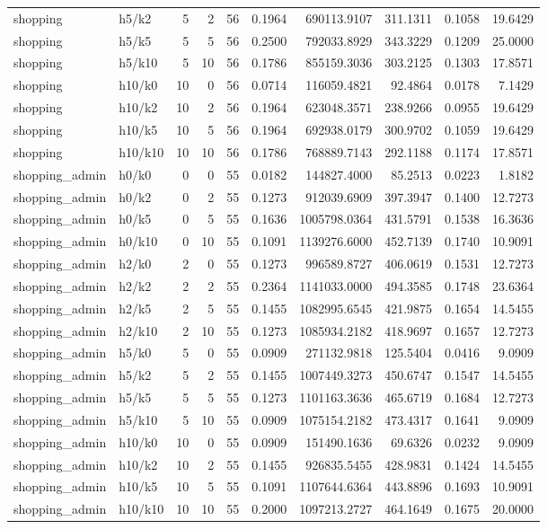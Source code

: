 \begin{tabular}{llrrrrrrrr}
shopping & h5/k2 & 5 & 2 & 56 & 0.1964 & 690113.9107 & 311.1311 & 0.1058 & 19.6429 \\
shopping & h5/k5 & 5 & 5 & 56 & 0.2500 & 792033.8929 & 343.3229 & 0.1209 & 25.0000 \\
shopping & h5/k10 & 5 & 10 & 56 & 0.1786 & 855159.3036 & 303.2125 & 0.1303 & 17.8571 \\
shopping & h10/k0 & 10 & 0 & 56 & 0.0714 & 116059.4821 & 92.4864 & 0.0178 & 7.1429 \\
shopping & h10/k2 & 10 & 2 & 56 & 0.1964 & 623048.3571 & 238.9266 & 0.0955 & 19.6429 \\
shopping & h10/k5 & 10 & 5 & 56 & 0.1964 & 692938.0179 & 300.9702 & 0.1059 & 19.6429 \\
shopping & h10/k10 & 10 & 10 & 56 & 0.1786 & 768889.7143 & 292.1188 & 0.1174 & 17.8571 \\
shopping_admin & h0/k0 & 0 & 0 & 55 & 0.0182 & 144827.4000 & 85.2513 & 0.0223 & 1.8182 \\
shopping_admin & h0/k2 & 0 & 2 & 55 & 0.1273 & 912039.6909 & 397.3947 & 0.1400 & 12.7273 \\
shopping_admin & h0/k5 & 0 & 5 & 55 & 0.1636 & 1005798.0364 & 431.5791 & 0.1538 & 16.3636 \\
shopping_admin & h0/k10 & 0 & 10 & 55 & 0.1091 & 1139276.6000 & 452.7139 & 0.1740 & 10.9091 \\
shopping_admin & h2/k0 & 2 & 0 & 55 & 0.1273 & 996589.8727 & 406.0619 & 0.1531 & 12.7273 \\
shopping_admin & h2/k2 & 2 & 2 & 55 & 0.2364 & 1141033.0000 & 494.3585 & 0.1748 & 23.6364 \\
shopping_admin & h2/k5 & 2 & 5 & 55 & 0.1455 & 1082995.6545 & 421.9875 & 0.1654 & 14.5455 \\
shopping_admin & h2/k10 & 2 & 10 & 55 & 0.1273 & 1085934.2182 & 418.9697 & 0.1657 & 12.7273 \\
shopping_admin & h5/k0 & 5 & 0 & 55 & 0.0909 & 271132.9818 & 125.5404 & 0.0416 & 9.0909 \\
shopping_admin & h5/k2 & 5 & 2 & 55 & 0.1455 & 1007449.3273 & 450.6747 & 0.1547 & 14.5455 \\
shopping_admin & h5/k5 & 5 & 5 & 55 & 0.1273 & 1101163.3636 & 465.6719 & 0.1684 & 12.7273 \\
shopping_admin & h5/k10 & 5 & 10 & 55 & 0.0909 & 1075154.2182 & 473.4317 & 0.1641 & 9.0909 \\
shopping_admin & h10/k0 & 10 & 0 & 55 & 0.0909 & 151490.1636 & 69.6326 & 0.0232 & 9.0909 \\
shopping_admin & h10/k2 & 10 & 2 & 55 & 0.1455 & 926835.5455 & 428.9831 & 0.1424 & 14.5455 \\
shopping_admin & h10/k5 & 10 & 5 & 55 & 0.1091 & 1107644.6364 & 443.8896 & 0.1693 & 10.9091 \\
shopping_admin & h10/k10 & 10 & 10 & 55 & 0.2000 & 1097213.2727 & 464.1649 & 0.1675 & 20.0000 \\
\bottomrule
\end{tabular}

